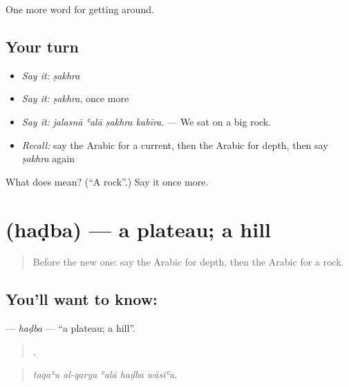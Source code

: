 \begin{grammarlens}[title={What you've built}]
One more word for getting around.
\end{grammarlens}

\subsection*{Your turn}
\begin{itemize}
\raggedright
  \item \emph{Say it:} \emph{ṣakhra}
  \item \emph{Say it:} \emph{ṣakhra}, once more
  \item \emph{Say it:} \emph{jalasnā ʿalā ṣakhra kabīra.} — We sat on a big rock.
  \item \emph{Recall:} say the Arabic for a current, then the Arabic for depth, then say \emph{ṣakhra} again
\end{itemize}

\begin{tcolorbox}[breakable,colback=teal!4,colframe=teal!35!black,title={Before you move on}]
What does  mean? (\textquotedblleft{}A rock\textquotedblright{}.) Say it once more.
\end{tcolorbox}
\section[\texorpdfstring{\ar{هضبة} (haḍba)}{هضبة (haḍba)}]{ (haḍba) — a plateau; a hill}

\label{lesson:AR-C472-hadba}



\begin{quote}
Before the new one: say the Arabic for depth, then the Arabic for a rock.
\end{quote}

\subsection*{You'll want to know: }
\textbf{} — \emph{haḍba} — \textquotedblleft{}a plateau; a hill\textquotedblright{}.

\begin{quote}
    .
\end{quote}

\begin{quote}
\emph{taqaʿu al-qarya ʿalā haḍba wāsiʿa.}
\end{quote}

